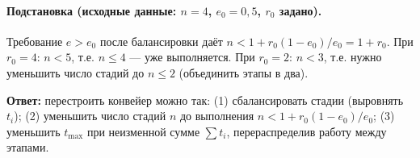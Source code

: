 \paragraph{Подстановка (исходные данные: $n = 4$, $e_0 = 0{,}5$, $r_0$ задано).}
Требование $e > e_0$ после балансировки даёт $n < 1 + r_0(1 - e_0)/e_0 = 1 + r_0$. При $r_0 = 4$: $n < 5$, т.е. $n \leq 4$ — уже выполняется. При $r_0 = 2$: $n < 3$, т.е. нужно уменьшить число стадий до $n \leq 2$ (объединить этапы в два).

\textbf{Ответ:} перестроить конвейер можно так: (1) сбалансировать стадии (выровнять $t_i$); (2) уменьшить число стадий $n$ до выполнения $n < 1 + r_0(1 - e_0)/e_0$; (3) уменьшить $t_{\max}$ при неизменной сумме $\sum t_i$, перераспределив работу между этапами.
